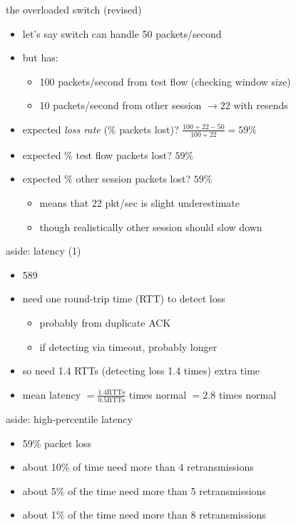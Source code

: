 \begin{frame}{the overloaded switch (revised)}
\begin{itemize}
\item let's say switch can handle 50 packets/second
\item but has:
    \begin{itemize}
    \item 100 packets/second from test flow (checking window size) 
    \item 10 packets/second from other session $\rightarrow 22$ with resends
    \end{itemize}
\item expected \textit{loss rate} (\% packets lost)? $\frac{100+22-50}{100+22}=59\%$
\item expected \% test flow packets lost? $59\%$
\item expected \% other session packets lost? $59\%$
    \begin{itemize}
    \item<2-> means that 22 pkt/sec is slight underestimate
    \item<2-> though realistically other session should slow down
    \end{itemize}
\end{itemize}
\end{frame}

\begin{frame}{aside: latency (1)}
\begin{itemize}
\item 589%
\item need one round-trip time (RTT) to detect loss
    \begin{itemize}
    \item probably from duplicate ACK
    \item if detecting via timeout, probably longer
    \end{itemize}
\item so need 1.4 RTTs (detecting loss 1.4 times) extra time 
\item mean latency $= \frac{1.4 \text{RTTs}}{0.5 \text{RTTs}}$ times normal $= 2.8$ times normal
\end{itemize}
\end{frame}

\begin{frame}{aside: high-percentile latency}
\begin{itemize}
\item 59\% packet loss
\item about 10\% of time need more than 4 retransmissions
\item about 5\% of the time need more than 5 retransmissions
\item about 1\% of the time need more than 8 retransmissions
\end{itemize}
\end{frame}


